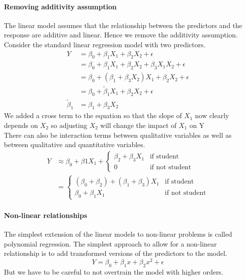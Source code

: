 \documentclass[../document.tex]{subfiles}
\begin{document}
	\paragraph{Removing additivity assumption}
	The linear model assumes that the relationship between the predictors and the response are additive and linear. Hence we remove the additivity assumption. \\
	Consider the standard linear regression model with two predictors.
	\begin{equation}
	\begin{split}
		Y &= \beta_{0}+\beta_{1}X_{1}+\beta_{2}X_{2}+\epsilon\\
		&=\beta_{0}+\beta_{1}X_{1}+\beta_{2}X_{2}+\beta_{3}X_{1}X_{2}+\epsilon\\
		&=\beta_{0}+(\beta_{1}+\beta_{3}X_{2})X_{1}+\beta_{2}X_{2}+\epsilon\\
		&=\beta_{0}+\tilde{\beta}_{1}X_{1}+\beta_{2}X_{2}+\epsilon\\
		\tilde{\beta}_{1}&=\beta_{1}+\beta_{3}X_{2}
	\end{split}
	\end{equation}
	We added a cross term to the equation so that the slope of \(X_{1}\) now clearly depends on \(X_{2}\) so adjusting \(X_{2}\) will change the impact of \(X_{1}\) on Y\\
	There can also be interaction terms between qualitative variables as well as between qualitative and quantitative variables.
	\begin{equation}
	\begin{split}
		Y &\approx \beta_{0}+\beta{1}X_{1}+\begin{cases}
			\beta_{2}+\beta_{3}X_{1} &\text{if student}\\
			0 &\text{if not student}
		\end{cases}\\
		&=\begin{cases}
			(\beta_{0}+\beta_{2})+(\beta_{1}+\beta_{3})X_{1} &\text{if student}\\
			\beta_{0}+\beta_{1}X_{1} &\text{if not student}
		\end{cases}
	\end{split}
	\end{equation}
	\paragraph{Non-linear relationships}
	The simplest extension of the linear models to non-linear problems is called polynomial regression. The simplest approach to allow for a non-linear relationship is to add transformed versions of the predictors to the model.
	\begin{equation}
		Y = \beta_{0}+\beta_{1}x+\beta_{2}x^2+\epsilon
	\end{equation}
	But we have to be careful to not overtrain the model with higher orders.
\end{document}
